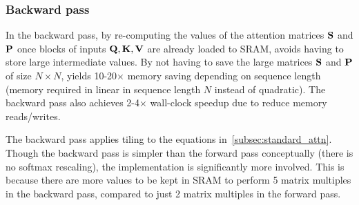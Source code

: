 \subsubsection{Backward pass}
In the backward pass, by re-computing the values of the attention matrices $\mathbf{S}$
and $\mathbf{P}$ once blocks of inputs $\mathbf{Q}, \mathbf{K}, \mathbf{V}$ are already loaded to SRAM,
\sysnameone avoids having to store large intermediate values.
By not having to save the large matrices $\mathbf{S}$ and $\mathbf{P}$ of size $N \times N$,
\sysnameone yields 10-20$\times$ memory saving depending on sequence length (memory
required in linear in sequence length $N$ instead of quadratic).
The backward pass also achieves 2-4$\times$ wall-clock speedup due to reduce memory
reads/writes.

The backward pass applies tiling to the equations in~\cref{subsec:standard_attn}.
Though the backward pass is simpler than the forward pass conceptually (there is
no softmax rescaling), the implementation is significantly more involved.
This is because there are more values to be kept in SRAM to perform 5 matrix
multiples in the backward pass, compared to just 2 matrix multiples in the
forward pass.

